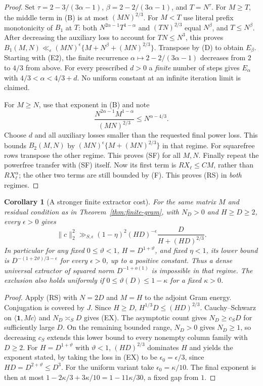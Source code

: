 \documentclass[11pt]{article}
\newtheorem{corollary}[theorem]{Corollary}
\theoremstyle{remark}\newtheorem{remark}[theorem]{Remark}
\begin{document}
\begin{proof}
Set $\tau=2-3/(3\alpha-1)$,
$\beta=2-2/(3\alpha-1)$, and $T=N^\tau$.
For $M\ge T$, the middle term in (B) is at most $(MN)^{2/3}$.
For $M<T$ use literal prefix monotonicity of $B_1$ at $T$:
both $N^{2\alpha-1}T^{1-\alpha}$ and $(TN)^{2/3}$ equal
$N^\beta$, and $T\le N^\beta$.
After decreasing the auxiliary loss to account for $TN\le N^3$,
this proves
$B_1(M,N)\ll_\epsilon(MN)^\epsilon
\{M+N^\beta+(MN)^{2/3}\}$.
Transpose by (D) to obtain $E_\beta$.
Starting with (E2), the finite recurrence
$\alpha\mapsto2-2/(3\alpha-1)$ decreases from $2$
to $4/3$ from above. For every prescribed $d>0$ a
\emph{finite} number of steps gives $E_\alpha$ with
$4/3<\alpha<4/3+d$. No uniform constant at an infinite
iteration limit is claimed.

For $M\ge N$, use that exponent in (B) and note
\[
 \frac{N^{2\alpha-1}M^{1-\alpha}}{(MN)^{2/3}}
 \le N^{\alpha-4/3}.
\]
Choose $d$ and all auxiliary losses smaller than the requested
final power loss. This bounds $B_2(M,N)$ by
$(MN)^\epsilon\{M+(MN)^{2/3}\}$ in that regime.
For squarefree rows transpose the other regime.
This proves (SF) for all $M,N$.
Finally repeat the powerfree transfer with (SF) itself.
Now its first term is $RX_\ell\le CM$, rather than
$RX_\ell^\alpha$; the other two terms are still bounded
by (F). This proves (RS) in \emph{both} regimes.
\end{proof}

\begin{corollary}[A stronger finite extractor cost]\label{cor:raw-extractor}
For the same matrix $M$ and residual condition as in
Theorem~\ref{thm:finite-gram}, with $N_D>0$ and $H\ge D\ge2$,
every $\epsilon>0$
gives
\[
 \|c\|_2^2\gg_{S,\epsilon}
 (1-\eta)^2(HD)^{-\epsilon}
                  \frac{D}{H+(HD)^{2/3}}.                     \tag{EX}
\]
In particular for any fixed $0\le\vartheta<1$,
$H=D^{1+\vartheta}$, and fixed $\eta<1$, its lower bound is
$D^{-(1+2\vartheta)/3-\epsilon}$ for every $\epsilon>0$,
up to a positive constant. Thus a dense universal extractor
of squared norm $D^{-1+o(1)}$ is impossible in that regime.
The exclusion also holds uniformly if
$0\le\vartheta(D)\le1-\kappa$ for a fixed $\kappa>0$.
\end{corollary}
\begin{proof}
Apply (RS) with $N=2D$ and $M=H$ to the adjoint Gram energy.
Conjugation is covered by $J$. Since $H\ge D$,
$H^{1/3}D\le(HD)^{2/3}$.
Cauchy--Schwarz on $\langle\mathbf1,Mc\rangle$ and
$N_D\asymp_SD$ gives (EX).
The asymptotic count gives $N_D\ge c_SD$ for sufficiently large $D$.
On the remaining bounded range, $N_D>0$ gives $N_D\ge1$,
so decreasing $c_S$ extends this lower bound to every nonempty
column family with $D\ge2$.
For $H=D^{1+\vartheta}$ with $\vartheta<1$,
$(HD)^{2/3}$ dominates $H$ and yields the exponent stated,
by taking the loss in (EX) to be $\epsilon_0=\epsilon/3$,
since $HD=D^{2+\vartheta}\le D^3$.
For the uniform variant take $\epsilon_0=\kappa/10$.
The final exponent is then at most
$1-2\kappa/3+3\kappa/10=1-11\kappa/30$,
a fixed gap from $1$.
\end{proof}
\end{document}
